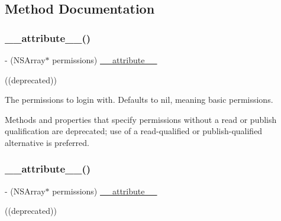 \subsection{Method Documentation}
\mbox{\label{interfaceFBLoginView_aed5ee6aec67e5fd04eed62c4ff09b9f4}} 
\subsubsection{\texorpdfstring{\+\_\+\+\_\+attribute\+\_\+\+\_\+()}{\_\_attribute\_\_()}\hspace{0.1cm}{\footnotesize\ttfamily [1/5]}}
{\footnotesize\ttfamily -\/ (N\+S\+Array$\ast$ permissions) \hyperlink{struct____attribute____}{\+\_\+\+\_\+attribute\+\_\+\+\_\+} \begin{DoxyParamCaption}\item[{((deprecated))}]{ }\end{DoxyParamCaption}}

The permissions to login with. Defaults to nil, meaning basic permissions.

Methods and properties that specify permissions without a read or publish qualification are deprecated; use of a read-\/qualified or publish-\/qualified alternative is preferred. \mbox{\label{interfaceFBLoginView_aed5ee6aec67e5fd04eed62c4ff09b9f4}} 
\subsubsection{\texorpdfstring{\+\_\+\+\_\+attribute\+\_\+\+\_\+()}{\_\_attribute\_\_()}\hspace{0.1cm}{\footnotesize\ttfamily [2/5]}}
{\footnotesize\ttfamily -\/ (N\+S\+Array$\ast$ permissions) \hyperlink{struct____attribute____}{\+\_\+\+\_\+attribute\+\_\+\+\_\+} \begin{DoxyParamCaption}\item[{((deprecated))}]{ }\end{DoxyParamCaption}}

